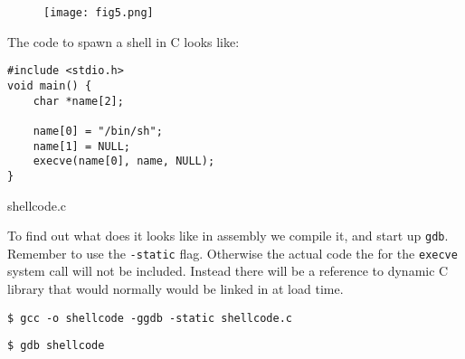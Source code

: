 \documentclass[a4paper]{article}
\begin{document}
\begin{figure}[H]
\centering
\texttt{[image: fig5.png]}
\end{figure}

The code to spawn a shell in C looks like:

\begin{listing}[ht]
\begin{verbatim}
#include <stdio.h>
void main() {
	char *name[2];

	name[0] = "/bin/sh";
	name[1] = NULL;
	execve(name[0], name, NULL);
}
\end{verbatim}
\caption{shellcode.c}
\label{listing:1}
\end{listing}

To find out what does it looks like in assembly we compile it, and start up \texttt{gdb}. Remember to use the \texttt{-static} flag. Otherwise the actual code the for the \texttt{execve} system call will not be included. Instead there will be a reference to dynamic C library that would normally would be linked in at load time.

\begin{lstlisting}[style=DOS]
$ gcc -o shellcode -ggdb -static shellcode.c
\end{lstlisting}

\begin{lstlisting}[style=DOS]
$ gdb shellcode
\end{lstlisting}
\end{document}
